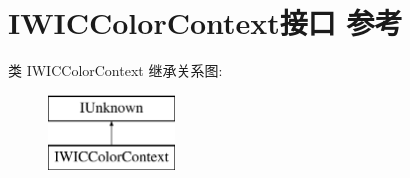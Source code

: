 \hypertarget{interface_i_w_i_c_color_context}{}\section{I\+W\+I\+C\+Color\+Context接口 参考}
\label{interface_i_w_i_c_color_context}
类 I\+W\+I\+C\+Color\+Context 继承关系图\+:\begin{figure}[H]
\begin{center}
\leavevmode
\includegraphics[height=2.000000cm]{interface_i_w_i_c_color_context}
\end{center}
\end{figure}
